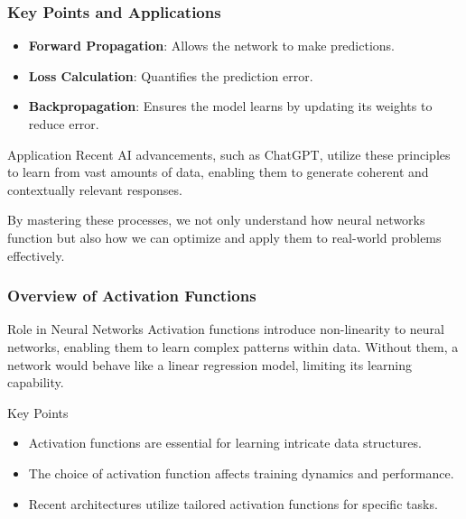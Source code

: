 \documentclass[aspectratio=169]{beamer}
\begin{document}
\begin{frame}[fragile]
    \frametitle{Key Points and Applications}
    \begin{itemize}
        \item \textbf{Forward Propagation}: Allows the network to make predictions.
        \item \textbf{Loss Calculation}: Quantifies the prediction error.
        \item \textbf{Backpropagation}: Ensures the model learns by updating its weights to reduce error.
    \end{itemize}

    \begin{block}{Application}
        Recent AI advancements, such as ChatGPT, utilize these principles to learn from vast amounts of data, enabling them to generate coherent and contextually relevant responses.
    \end{block}

    By mastering these processes, we not only understand how neural networks function but also how we can optimize and apply them to real-world problems effectively.
\end{frame}

\begin{frame}[fragile]
    \frametitle{Overview of Activation Functions}
    \begin{block}{Role in Neural Networks}
        Activation functions introduce non-linearity to neural networks, enabling them to learn complex patterns within data. Without them, a network would behave like a linear regression model, limiting its learning capability.
    \end{block}
    
    \begin{block}{Key Points}
        \begin{itemize}
            \item Activation functions are essential for learning intricate data structures.
            \item The choice of activation function affects training dynamics and performance.
            \item Recent architectures utilize tailored activation functions for specific tasks.
        \end{itemize}
    \end{block}
\end{frame}
\end{document}
